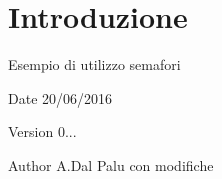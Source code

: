\hypertarget{index_intro}{}\section{Introduzione}\label{index_intro}
Esempio di utilizzo semafori

\begin{DoxyDate}{Date}
20/06/2016 
\end{DoxyDate}
\begin{DoxyVersion}{Version}
0... 
\end{DoxyVersion}
\begin{DoxyAuthor}{Author}
A.\+Dal Palu con modifiche 
\end{DoxyAuthor}
